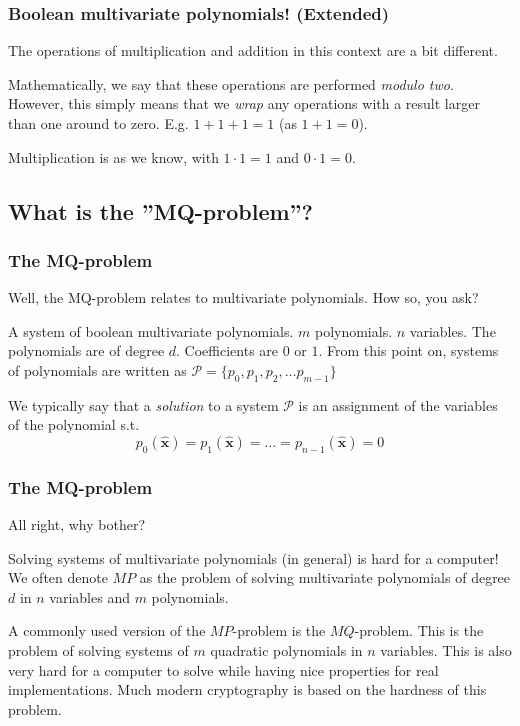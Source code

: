\documentclass{beamer}
\begin{document}
\begin{frame}
    \frametitle{Boolean multivariate polynomials! (Extended)}
    The operations of multiplication and addition in this context are a bit different.

    \pause 

    Mathematically, we say that these operations are performed \textit{modulo two}. However, this simply means that we \textit{wrap} any operations with a result larger than one around to zero. E.g. $1 + 1 + 1 = 1$ (as $1 + 1 = 0$).

    Multiplication is as we know, with $1 \cdot 1 = 1$ and $0 \cdot 1 = 0$.
\end{frame}

\subsection{What is the ''MQ-problem''?}
\begin{frame}
    \frametitle{The MQ-problem}
    Well, the MQ-problem relates to multivariate polynomials. How so, you ask?
    \pause
    \begin{outline}
        \1 A system of boolean multivariate polynomials.
            \2 $m$ polynomials. 
            \2 $n$ variables.
            \2 The polynomials are of degree $d$.
            \2 Coefficients are $0$ or $1$.
            \2 From this point on, systems of polynomials are written as $\mathcal{P} = \{p_0, p_1, p_2, \dots p_{m-1}\}$
    \end{outline}

    \pause 

    We typically say that a \textit{solution} to a system $\mathcal{P}$ is an assignment of the variables of the polynomial s.t. 
    $$
        p_{0}(\hat{\mathbf{x}}) = p_{1}(\hat{\mathbf{x}}) = \dots = p_{n-1}(\hat{\mathbf{x}}) = 0
    $$
\end{frame}

\begin{frame}
    \frametitle{The MQ-problem}
    All right, why bother?
    \pause
    \begin{outline}
        \1 Solving systems of multivariate polynomials (in general) is hard for a computer!
            \2 We often denote $MP$ as the problem of solving multivariate polynomials of degree $d$ in $n$ variables and $m$ polynomials.

        \pause 

        \1 A commonly used version of the $MP$-problem is the $MQ$-problem.
            \2 This is the problem of solving systems of $m$ quadratic polynomials in $n$ variables.
            \2 This is also very hard for a computer to solve while having nice properties for real implementations.
            \2 Much modern cryptography is based on the hardness of this problem.
    \end{outline}
\end{frame}
\end{document}
